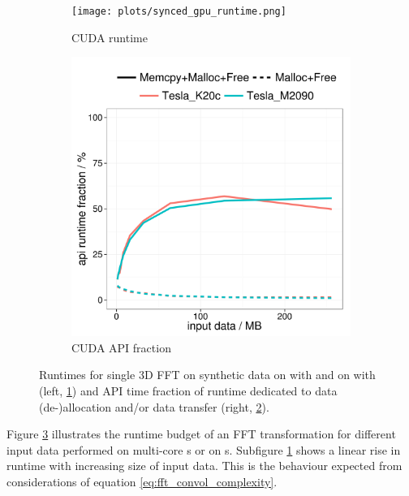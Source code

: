 \begin{figure}[h]
  \centering
  \hfill
  \begin{subfigure}[b]{0.45\textwidth}
    \texttt{[image: plots/synced\_gpu\_runtime.png]}
    \caption{CUDA runtime}
    \label{fig:single_fft_runtime}
  \end{subfigure}%
  \hfill
  \begin{subfigure}[b]{0.45\textwidth}
    \includegraphics[width=\textwidth]{plots/synced_gpu_api_fractioninplace}
    \caption{CUDA API fraction}
    \label{fig:single_fft_api_fraction}
  \end{subfigure}
  \hfill
  \caption{Runtimes for single 3D FFT on synthetic data on \cpu{} with \fftw{} and on \gpu{} with \cufft{} (left, \ref{fig:single_fft_runtime}) and API time fraction of runtime dedicated to data (de-)allocation and/or data transfer (right, \ref{fig:single_fft_api_fraction}).}
  \label{fig:rt_single_fft}
\end{figure}

Figure \ref{fig:rt_single_fft} illustrates the runtime budget of an FFT transformation for different input data performed on multi-core \cpu{}s or on \gpu{}s. Subfigure \ref{fig:single_fft_runtime} shows a linear rise in runtime with increasing size of input data. This is the behaviour expected from considerations of equation \ref{eq:fft_convol_complexity}. \\

